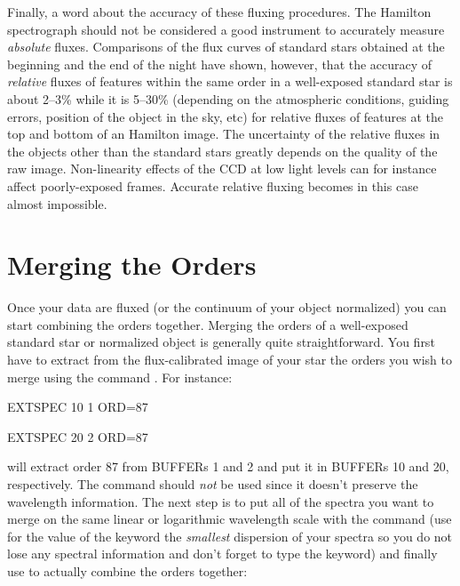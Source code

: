 Finally, a word about the accuracy of these fluxing procedures.  The Hamilton
spectrograph should not be considered a good instrument to accurately measure
{\it absolute} fluxes.  Comparisons of the flux curves of standard stars
obtained at the beginning and the end of the night have shown, however, that
the accuracy of {\it relative} fluxes of features within the same order in a
well-exposed standard star is about 2--3\% while it is 5--30\% (depending
on the atmospheric conditions, guiding errors, position of the object in the
sky, etc) for relative fluxes of features at the top and bottom of an
Hamilton image. The uncertainty of the relative fluxes in the objects other
than the standard stars greatly depends on the quality of the raw image.
Non-linearity effects of the CCD at low light levels can for instance affect
poorly-exposed frames. Accurate relative fluxing becomes in this case almost
impossible.


\section{Merging the Orders}
\label{sec:hammerge}

Once your data are fluxed (or the continuum of your object normalized)
you can start combining the orders together. Merging
the orders of a well-exposed standard star or normalized object is generally
quite straightforward.  You first have to extract from the flux-calibrated
image of your star the orders you wish to merge using the command
. For instance:

\begin{command}
      \item {EXTSPEC 10 1 ORD=87}
      \item {EXTSPEC 20 2 ORD=87}
\end{command}

\noindent
will extract order 87 from BUFFERs 1 and 2 and put it in BUFFERs 10 and 20,
respectively. The command  should {\it not} be used since it
doesn't preserve the wavelength information. The next step is to put all of
the spectra you want to merge on the same linear or logarithmic wavelength
scale with the command  (use for the value of the keyword
 the {\it smallest} dispersion of your spectra so you do not lose
any spectral information and don't forget to type the  keyword)
and finally use  to actually combine the orders together:

